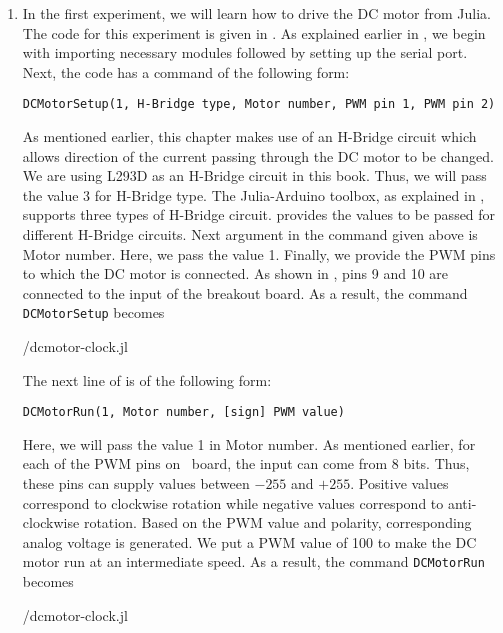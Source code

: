 \begin{enumerate}
  \item In the first experiment, we will learn how to drive the DC motor
        from Julia. The code for this experiment is 
        given in  . 
        As explained earlier in , we begin with 
        importing necessary modules followed by setting up the serial port. 
        Next, the code has a command of the following form: 
        \begin{lstlisting}[style=nonumbers]
          DCMotorSetup(1, H-Bridge type, Motor number, PWM pin 1, PWM pin 2)
        \end{lstlisting}
        As mentioned earlier, this chapter makes use of an H-Bridge circuit which 
        allows direction of the current passing through the DC motor to be changed.
        We are using L293D as an H-Bridge circuit in this book. Thus, we will pass the value 3 for
        H-Bridge type. The Julia-Arduino toolbox, as explained in , 
        supports three types of H-Bridge circuit. 
        provides the values to be passed for different H-Bridge circuits. 
        Next argument in the command given above is Motor number. Here, we pass the value 1. 
        Finally, we provide the PWM pins to which the DC motor is connected. As 
        shown in , pins 9 and 10 are connected to the
        input of the breakout board. As a result, the command {\tt DCMotorSetup} becomes
        
        {\LocDCMjuliacode/dcmotor-clock.jl}
        
        The next line of  is of the following form: 
        \begin{lstlisting}[style=nonumbers]
          DCMotorRun(1, Motor number, [sign] PWM value)
        \end{lstlisting}
        Here, we will pass the value 1 in Motor number.  As mentioned earlier, 
        for each of the PWM pins on \arduino\ board, the input can come from 8 bits.
        Thus, these pins can supply values between $- 255$ and $+ 255$. Positive values correspond to clockwise
        rotation while negative values correspond to anti-clockwise rotation. Based on the PWM value and polarity, 
        corresponding analog voltage is generated.  
        We put a PWM value of 100 to make the DC motor run at an intermediate speed.  
        As a result, the command {\tt DCMotorRun} becomes
        
        {\LocDCMjuliacode/dcmotor-clock.jl}
        

\end{enumerate}
